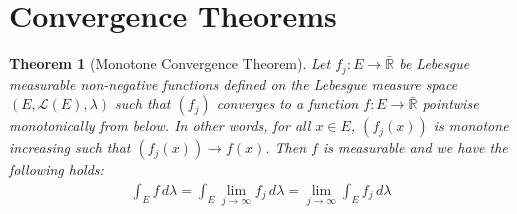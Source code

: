\documentclass[11pt]{book}
\theoremstyle{break}
\theoremstyle{break}
\newtheorem{thm}{Theorem}[section]
\newcommand{\R}{\mathbb{R}}
\begin{document}
\newpage
\section[Convergence Theorems]{\color{red}Convergence Theorems\color{black}}
\begin{thm}[Monotone Convergence Theorem]
Let $f_j: E \to \bar{\R}$ be Lebesgue measurable non-negative functions defined on the Lebesgue measure space $(E,\mathcal{L}(E), \lambda)$ such that $(f_j)$ converges to a function $f:E \to \bar{\R}$ pointwise monotonically from below. In other words, for all $x\in E$, $(f_j(x))$ is monotone increasing such that $(f_j(x)) \to f(x)$. Then $f$ is measurable and we have the following holds:
\begin{align}
\int_E f\, d\lambda = \int_E \lim_{j\to \infty}f_j \, d\lambda = \lim_{j\to \infty}\int_E f_j \, d\lambda
\end{align}
\end{thm}
\end{document}
